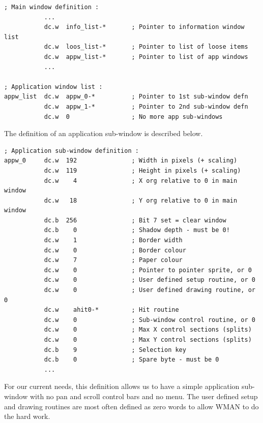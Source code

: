 \begin{lstlisting}[firstnumber=1,caption={Example Application Sub-Window List Definition}]
; Main window definition :
           ...
           dc.w  info_list-*       ; Pointer to information window list
           dc.w  loos_list-*       ; Pointer to list of loose items
           dc.w  appw_list-*       ; Pointer to list of app windows
           ...

; Application window list :
appw_list  dc.w  appw_0-*          ; Pointer to 1st sub-window defn
           dc.w  appw_1-*          ; Pointer to 2nd sub-window defn
           dc.w  0                 ; No more app sub-windows
\end{lstlisting}

The definition of an application sub-{}window is described
    below.

\begin{lstlisting}[firstnumber=last,caption={Example Application Sub-Window Definition}]
; Application sub-window definition :
appw_0     dc.w  192               ; Width in pixels (+ scaling)
           dc.w  119               ; Height in pixels (+ scaling)
           dc.w    4               ; X org relative to 0 in main window
           dc.w   18               ; Y org relative to 0 in main window
           dc.b  256               ; Bit 7 set = clear window
           dc.b    0               ; Shadow depth - must be 0!
           dc.w    1               ; Border width
           dc.w    0               ; Border colour
           dc.w    7               ; Paper colour
           dc.w    0               ; Pointer to pointer sprite, or 0
           dc.w    0               ; User defined setup routine, or 0
           dc.w    0               ; User defined drawing routine, or 0
           dc.w    ahit0-*         ; Hit routine
           dc.w    0               ; Sub-window control routine, or 0
           dc.w    0               ; Max X control sections (splits)
           dc.w    0               ; Max Y control sections (splits)
           dc.b    9               ; Selection key
           dc.b    0               ; Spare byte - must be 0
           ...
\end{lstlisting}

For our current needs, this definition allows us to have a simple
    application sub-{}window with no pan and scroll control bars and no menu.
    The user defined setup and drawing routines are most often defined as zero
    words to allow WMAN to do the hard work.

